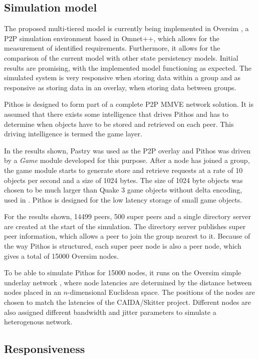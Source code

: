 \documentclass[10pt,a4paper,conference]{IEEEtran}
\begin{document}
\subsection{Simulation model}
\label{test_setup}

The proposed multi-tiered model is currently being implemented in Oversim \cite{OverSim_2007}, a P2P simulation environment based in Omnet++, which
allows for the measurement of identified requirements. Furthermore, it allows for the comparison of the current model with other state persistency
models. Initial results are promising, with the implemented model functioning as expected. The simulated system is very responsive when storing data
within a group and as responsive as storing data in an overlay, when storing data between groups.

Pithos is designed to form part of a complete P2P MMVE network solution. It is assumed that there exists some intelligence that drives Pithos and has
to determine when objects have to be stored and retrieved on each peer. This driving intelligence is termed the game layer.

In the results shown, Pastry was used as the P2P overlay and Pithos was driven by a \emph{Game} module developed for this purpose. After a node has
joined a group, the game module starts to generate store and retrieve requests at a rate of 10 objects per second and a size of 1024 bytes. The size
of 1024 byte objects was chosen to be much larger than Quake 3 game objects without delta encoding, used in \cite{Bharambe_Donnybrook}. Pithos is
designed for the low latency storage of small game objects.

For the results shown, 14499 peers, 500 super peers and a single directory server are created at the start of the simulation. The directory server
publishes super peer information, which allows a peer to join the group nearest to it. Because of the way Pithos is structured, each super peer node
is also a peer node, which gives a total of 15000 Oversim nodes.

To be able to simulate Pithos for 15000 nodes, it runs on the Oversim simple underlay network \cite{oversim_applications}, where node latencies are
determined by the distance between nodes placed in an $n$-dimensional Euclidean space. The positions of the nodes are chosen to match the latencies
of the CAIDA/Skitter project. Different nodes are also assigned different bandwidth and jitter parameters to simulate a heterogenous network.

\subsection{Responsiveness}
\end{document}
